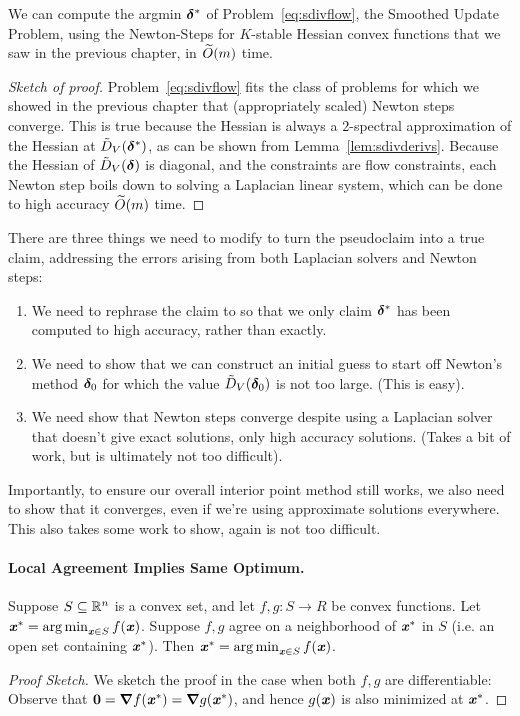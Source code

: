 \begin{pseudoclaim}
  We can compute the argmin $\boldsymbol{\delta}^*$ of
  Problem~\eqref{eq:sdivflow}, the Smoothed Update Problem, using the Newton-Steps for
  $K$-stable Hessian convex functions that we saw in the previous chapter, in
  $\widetilde{O}(m)$ time.
\end{pseudoclaim}
\begin{proof}[Sketch of proof]
  Problem~\eqref{eq:sdivflow} fits the class of problems for which we
  showed in the previous chapter 
  that (appropriately scaled) Newton steps converge.
  This is true because the Hessian is always a $2$-spectral
  approximation of the Hessian at $\tilde{D}_V( \boldsymbol{\delta}^* )$, as can be
  shown from Lemma~\ref{lem:sdivderivs}.
  Because the Hessian of $\tilde{D}_V( \boldsymbol{\delta} )$ is diagonal, and the
  constraints are flow constraints, each
  Newton step boils down to solving a Laplacian linear system, which can
  be done to high accuracy $\widetilde{O}(m)$ time.
\end{proof}

\begin{remark}
  There are three things we need to modify to turn the pseudoclaim
  into a true claim, addressing the errors arising from both Laplacian
  solvers and Newton steps:
  \begin{enumerate}
  \item We need to rephrase the claim to so that we only claim
    $\boldsymbol{\delta}^*$ has been computed to high accuracy, rather than exactly.
  \item We need to show that we can construct an initial guess to
    start off Newton's method $\boldsymbol{\delta}_0$ for which the value
    $\tilde{D}_V( \boldsymbol{\delta}_0 )$ is not too large. (This is easy).
  \item We need show that Newton steps converge despite using a
    Laplacian solver that doesn't give exact solutions, only high
    accuracy solutions. (Takes a bit of work, but is ultimately not
    too difficult).
  \end{enumerate}
Importantly, to ensure our overall interior point method still works,
  we also need to show that it converges,
even if we're using approximate solutions
everywhere. This also takes some work to show, again is not too difficult.
\end{remark}


\paragraph{Local Agreement Implies Same Optimum.}
\begin{lemma}
  \label{lem:argminsfromlocalagreement}
  Suppose $S \subseteq \mathbb{R}^n$ is a convex set, and let $f, g: S \to R$ be convex
  functions.
  Let $\boldsymbol{\mathit{x}}^* = \operatorname*{arg\,min}_{\boldsymbol{\mathit{x}} \in S} f(\boldsymbol{\mathit{x}})$.
  Suppose $f,g$ agree on a neighborhood of $\boldsymbol{\mathit{x}}^*$ in $S$ (i.e. an
  open set containing $\boldsymbol{\mathit{x}}^*$).
  Then $\boldsymbol{\mathit{x}}^* = \operatorname*{arg\,min}_{\boldsymbol{\mathit{x}} \in S} f(\boldsymbol{\mathit{x}})$.
\end{lemma}
\begin{proof}[Proof Sketch]
  We sketch the proof in the case when both $f,g$ are differentiable: Observe
  that $\boldsymbol{0} = \boldsymbol{\nabla} f(\boldsymbol{\mathit{x}}^*) = \boldsymbol{\nabla} g(\boldsymbol{\mathit{x}}^*)$, and hence $g(\boldsymbol{\mathit{x}})$
  is also minimized at $\boldsymbol{\mathit{x}}^*$.
\end{proof}

